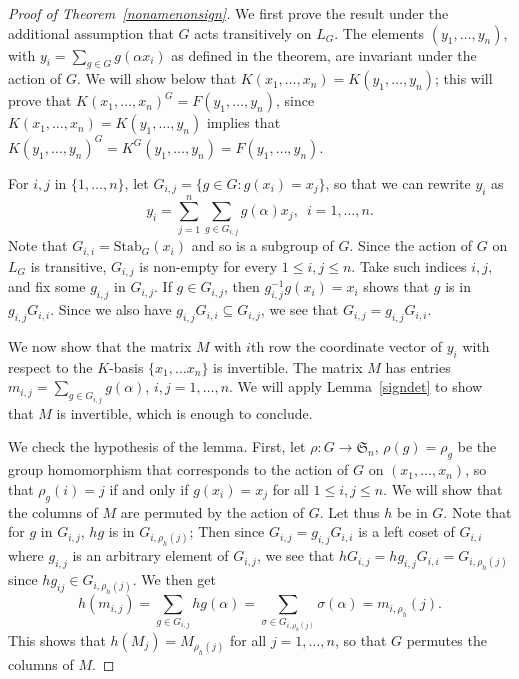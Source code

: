 \documentclass[12pt]{article}
\theoremstyle{plain}
\begin{document}
\begin{proof}[Proof of Theorem~\ref{nonamenonsign}]
  We first prove the result under the additional assumption that $G$
  acts transitively on $L_G$.  The elements $(y_1,\dots,y_n)$, with
  $y_i = \sum_{g \in G} g(\alpha x_i)$ as defined in the theorem, are
  invariant under the action of $G$. We will show below that
  $K(x_1,\dots,x_n)=K(y_1,\dots,y_n)$; this will prove that
  $K(x_1,\dots,x_n)^G=F(y_1,\dots,y_n)$, since
  $K(x_1,\dots,x_n)=K(y_1,\dots,y_n)$ implies that
  $K(y_1,\dots,y_n)^G=K^G(y_1,\dots,y_n)=F(y_1,\dots,y_n)$.

  For $i,j$ in $\{1,\dots,n\}$, let $G_{i,j}= \lbrace g \in G: g(x_i)
  = x_j \rbrace$, so that we can rewrite $y_i$ as $$y_i = \sum^n_{j
    =1}\sum_{g \in G_{i,j}}g(\alpha)x_j, \,\,\, i = 1, \ldots, n.$$
  Note that $G_{i,i}=\mathrm{Stab}_G(x_i)$ and so is a subgroup of $G$. Since the action of $G$ on $L_G$ is 
  transitive, $G_{i,j}$ is
  non-empty for every $1 \leq i,j \leq n$. Take such indices $i,j$,
  and fix some $g_{i,j}$ in $G_{i,j}$. If $g \in G_{i,j}$, then
  $g^{-1}_{i,j}g(x_i) = x_i$ shows that $g$ is in
  $g_{i,j}G_{i,i}$. Since we also have
  $g_{i,j}G_{i,i} \subseteq G_{i,j}$, we see that
  $G_{i,j} = g_{i,j}G_{i,i}$.



  We now show that the matrix $M$ with $i$th row the coordinate vector
  of $y_i$ with respect to the $K$-basis $\lbrace x_1, \ldots x_n
  \rbrace$ is invertible. The matrix $M$ has entries $m_{i,j} =
  \sum_{g \in G_{i,j}}g(\alpha)$, $i,j = 1, \ldots, n$. We will apply
  Lemma~\ref{signdet} to show that $M$ is invertible, which is enough
  to conclude.

  We check the hypothesis of the lemma. First, let $\rho: G \to
  \mathfrak{S}_n$, $\rho(g) = \rho_g$ be the group homomorphism that
  corresponds to the action of $G$ on $(x_1, \ldots , x_n)$, so that
  $\rho_g(i) = j$ if and only if $g(x_i) = x_j$ for all $1 \leq
  i,j\leq n$. We will show that the columns of $M$ are permuted by the
  action of $G$. Let thus $h$ be in $G$. Note that for $g$ in
  $G_{i,j}$, $hg$ is in $G_{i,\rho_h(j)}$; 
  Then since $G_{i,j}=g_{i,j}G_{i,i}$ is a left coset of $G_{i,i}$ where $g_{i,j}$
is an arbitrary element of $G_{i,j}$, we see that $hG_{i,j}=hg_{i,j}G_{i,i}=G_{i,\rho_h(j)}$ 
since $hg_{ij}\in G_{i,\rho_h(j)}$.  We then get
  $$h(m_{i,j}) = \sum_{g \in G_{i,j}}hg(\alpha) = \sum_{\sigma \in
    G_{i, \rho_{h}(j)}}\sigma (\alpha) = m_{i,\rho_{h}}(j).$$ This
  shows that $h(M_j) = M_{\rho_h(j)}$ for all $j = 1, \ldots, n$, so
  that $G$ permutes the columns of $M$. 
  

\end{proof}
\end{document}
